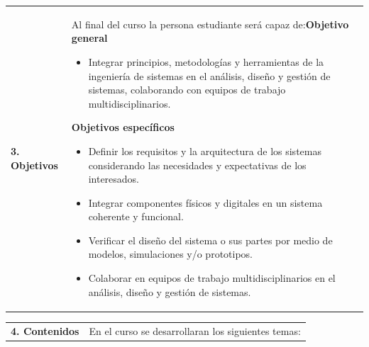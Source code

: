 \documentclass[letterpaper]{article}%
\begin{document}
\begin{tabularx}{\textwidth}{p{3cm}p{13cm}}%
\par\fontsize{12}{14}\selectfont \textbf{\textcolor{parte}{3. Objetivos}}&Al final del curso la persona estudiante será capaz de:\newline\newline \textbf{Objetivo general}\begin{itemize}\item Integrar principios, metodologías y herramientas de la ingeniería de sistemas en el análisis, diseño y gestión de sistemas, colaborando con equipos de trabajo multidisciplinarios.\end{itemize} \vspace{2mm}\textbf{Objetivos específicos}\begin{itemize}\item Definir los requisitos y la arquitectura de los sistemas considerando las necesidades y expectativas de los interesados.\item Integrar componentes físicos y digitales en un sistema coherente y funcional.\item Verificar el diseño del sistema o sus partes por medio de modelos, simulaciones y/o prototipos.\item Colaborar en equipos de trabajo multidisciplinarios en el análisis, diseño y gestión de sistemas.\end{itemize}\\%
\end{tabularx}%
\newpage%
\begin{tabularx}{\textwidth}{p{3cm}p{13cm}}%
\par\fontsize{12}{14}\selectfont \textbf{\textcolor{parte}{4. Contenidos}}&En el curso se desarrollaran los siguientes temas:\\%
\end{tabularx}%
\newline%
\end{document}

